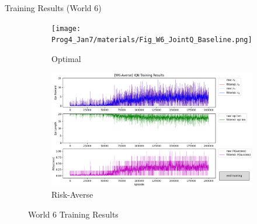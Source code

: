 \documentclass[aspectratio=1610, xcolor=dvipsnames]{packages/beamer}
\begin{document}
\begin{frame}{Training Results (World 6)}
     \begin{figure}
     \centering
          \begin{subfigure}[b]{\Wfig\textwidth}  \centering
              \texttt{[image: Prog4\_Jan7/materials/Fig\_W6\_JointQ\_Baseline.png]}
              \caption{Optimal} \label{fig:W6baseline}
          \end{subfigure}
          \hfill
         \begin{subfigure}[b]{\Wfig\textwidth} \centering
             \includegraphics[width=\textwidth]{../results/IDQN_W6/Fig_W6_JointQ_Averse}
             \caption{Risk-Averse} \label{fig:W6averse}
         \end{subfigure}
    \caption{World 6 Training Results}
    \label{fig:W6}
    \end{figure}
\end{frame}
\end{document}

